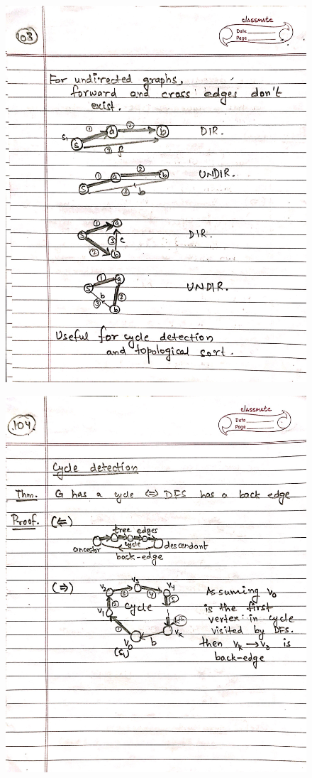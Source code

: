\begin{figure}[H]
    \centering
    \includegraphics[scale=0.25]{"./MIT-6.006/MIT-6006-103"}
\end{figure}
\newpage
\begin{figure}[H]
    \centering
    \includegraphics[scale=0.25]{"./MIT-6.006/MIT-6006-104"}
\end{figure}
